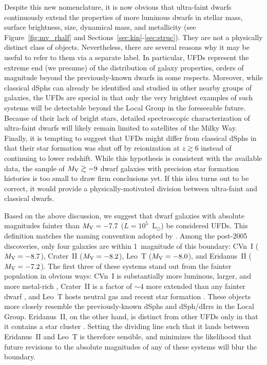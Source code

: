 \documentclass[a4paper]{ar-1col}
\begin{document}
Despite this new nomenclature, it is now obvious that ultra-faint
dwarfs continuously extend the properties of more luminous dwarfs in
stellar mass, surface brightness, size, dynamical mass, and
metallicity (see Figure~\ref{fig:mv_rhalf} and
Sections~\ref{sec:kin}-\ref{sec:struc}).  They are not a physically
distinct class of objects.  Nevertheless, there are several reasons
why it may be useful to refer to them via a separate label.  In
particular, UFDs represent the extreme end (we presume) of the
distribution of galaxy properties, orders of magnitude beyond the
previously-known dwarfs in some respects.  Moreover, while classical
dSphs can already be identified and studied in other nearby groups of
galaxies, the UFDs are special in that only the very brightest
examples of such systems will be detectable beyond the Local Group in
the foreseeable future.  Because of their lack of bright stars,
detailed spectroscopic characterization of ultra-faint dwarfs will
likely remain limited to satellites of the Milky Way.  Finally, it is
tempting to suggest that UFDs might differ from classical dSphs in
that their star formation was shut off by reionization at $z \gtrsim
6$ instead of continuing to lower redshift.  While this hypothesis is
consistent with the available data, the sample of $M_{{\rm V}} \gtrsim
-9$ dwarf galaxies with precision star formation histories is too
small to draw firm conclusions yet.  If this idea turns out to be
correct, it would provide a physically-motivated division between
ultra-faint and classical dwarfs.

Based on the above discussion, we suggest that dwarf galaxies with
absolute magnitudes fainter than $M_{{\rm V}} = -7.7$ ($L =
10^{5}$~L$_{\odot}$) be considered UFDs.  This definition matches the
naming convention adopted by \citet{bbk17}.  Among the post-2005
discoveries, only four galaxies are within 1~magnitude of this
boundary: CVn~I ($M_{{\rm V}} = -8.7$), Crater~II ($M_{{\rm V}} =
-8.2$), Leo~T ($M_{{\rm V}} = -8.0$), and Eridanus~II ($M_{{\rm V}} =
-7.2$).  The first three of these systems stand out from the fainter
population in obvious ways: CVn~I is substantially more luminous,
larger, and more metal-rich
\citep[e.g.,][]{martin07,martin08,sg07,munoz18b}, Crater~II is a
factor of $\sim4$ more extended than any fainter dwarf
\citep{torrealba16}, and Leo~T hosts neutral gas and recent star
formation \citep{rw08,dejong08}.  These objects more closely resemble
the previously-known dSphs and dSph/dIrrs in the Local Group.
Eridanus~II, on the other hand, is distinct from other UFDs only in
that it contains a star cluster \citep{crnojevic16b}.  Setting the
dividing line such that it lands between Eridanus~II and Leo~T is
therefore sensible, and minimizes the likelihood that future revisions
to the absolute magnitudes of any of these systems will blur the
boundary.
\end{document}
